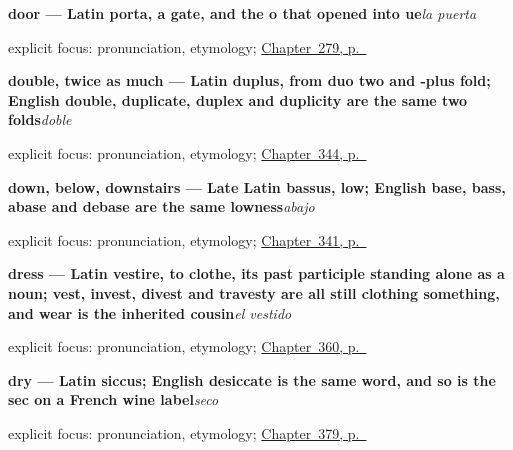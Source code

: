 \noindent\begin{minipage}[t]{\linewidth}
\raggedright
\textbf{door — Latin porta, a gate, and the o that opened into ue}\enspace\emph{la puerta}\par
\footnotesize explicit focus: pronunciation, etymology; \hyperref[ch:la-habitacion]{Chapter~279, p.~\pageref*{ch:la-habitacion}}
\end{minipage}\par\smallskip

\noindent\begin{minipage}[t]{\linewidth}
\raggedright
\textbf{double, twice as much — Latin duplus, from duo two and -plus fold; English double, duplicate, duplex and duplicity are the same two folds}\enspace\emph{doble}\par
\footnotesize explicit focus: pronunciation, etymology; \hyperref[ch:cero-y-mitad]{Chapter~344, p.~\pageref*{ch:cero-y-mitad}}
\end{minipage}\par\smallskip

\noindent\begin{minipage}[t]{\linewidth}
\raggedright
\textbf{down, below, downstairs — Late Latin bassus, low; English base, bass, abase and debase are the same lowness}\enspace\emph{abajo}\par
\footnotesize explicit focus: pronunciation, etymology; \hyperref[ch:arriba-y-abajo]{Chapter~341, p.~\pageref*{ch:arriba-y-abajo}}
\end{minipage}\par\smallskip

\noindent\begin{minipage}[t]{\linewidth}
\raggedright
\textbf{dress — Latin vestire, to clothe, its past participle standing alone as a noun; vest, invest, divest and travesty are all still clothing something, and wear is the inherited cousin}\enspace\emph{el vestido}\par
\footnotesize explicit focus: pronunciation, etymology; \hyperref[ch:la-ropa-y-el-zapato]{Chapter~360, p.~\pageref*{ch:la-ropa-y-el-zapato}}
\end{minipage}\par\smallskip

\noindent\begin{minipage}[t]{\linewidth}
\raggedright
\textbf{dry — Latin siccus; English desiccate is the same word, and so is the sec on a French wine label}\enspace\emph{seco}\par
\footnotesize explicit focus: pronunciation, etymology; \hyperref[ch:seco-y-mojado]{Chapter~379, p.~\pageref*{ch:seco-y-mojado}}
\end{minipage}\par\smallskip

